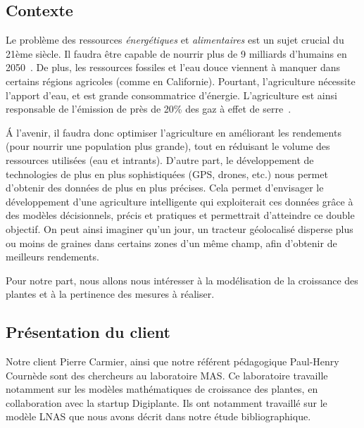 \subsection{Contexte}
Le problème des ressources \textit{énergétiques} et \textit{alimentaires} est un sujet crucial du  21ème siècle.
Il faudra être capable de nourrir plus de 
9 milliards d'humains en 2050~\cite{wiki:popu_mondiale}.
De plus, les ressources fossiles et l'eau douce viennent à manquer dans certains régions agricoles (comme en Californie). Pourtant, l'agriculture nécessite l'apport d'eau, et est grande consommatrice d'énergie. L'agriculture est ainsi responsable de l'émission de près de 20\% des gaz à effet de serre~\cite{GES}.

\'A l'avenir, il faudra donc optimiser l'agriculture en améliorant les rendements (pour nourrir une population plus grande), tout en réduisant le volume des ressources utilisées (eau et intrants).
D'autre part, le développement de technologies de plus en plus sophistiquées (GPS, drones, etc.) nous permet d'obtenir des données de plus en plus précises.
Cela permet d'envisager le développement d'une agriculture intelligente qui exploiterait ces données grâce à des modèles décisionnels, précis et pratiques et permettrait d'atteindre ce double objectif. On peut ainsi imaginer qu'un jour, un tracteur géolocalisé disperse plus ou moins de graines dans certains zones d'un même champ, afin d'obtenir de meilleurs rendements.

Pour notre part, nous allons nous intéresser à la modélisation de la croissance des plantes et à la pertinence des mesures à réaliser.

\subsection{Présentation du client}
Notre client Pierre Carmier, ainsi que notre référent pédagogique Paul-Henry Cournède sont des chercheurs au laboratoire MAS. 
Ce laboratoire travaille notamment sur les modèles mathématiques de
croissance des plantes, en collaboration avec la startup Digiplante.
Ils ont notamment travaillé sur le modèle LNAS que nous avons décrit
dans notre étude bibliographique.
